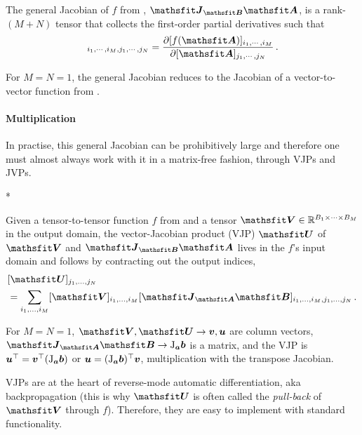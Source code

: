 \begin{definition}\label{def:general_jacobian}
  The general Jacobian of $f$ from , $\tJ_{\tB}\tA$, is a rank-$(M+N)$ tensor that collects the first-order partial derivatives such that
  \begin{align*}
    [\tJ_{\tA}\tB]_{i_1, \cdots, i_M, j_1, \cdots, j_N} = \frac{\partial [f(\tA)]_{i_1, \cdots, i_M}}{\partial [\tA]_{j_1, \cdots, j_N}}\,.
  \end{align*}
\end{definition}
For $M=N=1$, the general Jacobian reduces to the Jacobian of a vector-to-vector function from .

\paragraph{Multiplication} In practise, this general Jacobian can be prohibitively large and therefore one must almost always work with it in a matrix-free fashion, \ie  through VJPs and JVPs.

\switchcolumn[1]*
\switchcolumn[0]

\begin{definition}\label{def:vjp}
  Given a tensor-to-tensor function $f$ from  and a tensor $\tV \in \sR^{B_1 \times \dots \times B_M}$ in the output domain, the vector-Jacobian product (VJP) $\tU$ of $\tV$ and $\tJ_{\tB}\tA$ lives in the $f$'s input domain and follows by contracting out the output indices,
  \begin{align*}
     & [\tU]_{j_1, \dots, j_N}
    \\
     & =
    \sum_{i_1, \dots, i_M}
    [\tV]_{i_1, \dots, i_M}
    [\tJ_{\tA}\tB]_{i_1, \dots, i_M, j_1, \dots, j_N}\,.
  \end{align*}
\end{definition}
For $M=N=1$, $\tV, \tU \to \vv, \vu$ are column vectors, $\tJ_{\tA}\tB \to \jac_{\va}\vb$ is a matrix, and the VJP is ${\bm{u}}^{\top} = {\bm{v}}^{\top} (\mathrm{J}_{{\bm{a}}}{\bm{b}})$ or ${\bm{u}} = (\mathrm{J}_{{\bm{a}}}{\bm{b}})^{\top} {\bm{v}}$, \ie multiplication with the transpose Jacobian.

VJPs are at the heart of reverse-mode automatic differentiation, aka backpropagation (this is why $\tU$ is often called the \emph{pull-back} of $\tV$ through $f$).
Therefore, they are easy to implement with standard functionality.


